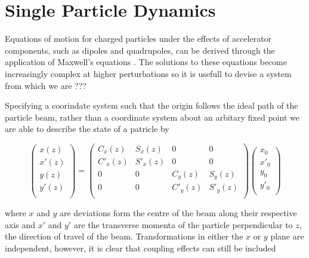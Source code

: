 

\section{Single Particle Dynamics}
\label{sec:single_particle_dynamics}

Equations of motion for charged particles under the effects of accelerator
components, such as dipoles and quadrupoles, can be derived through the
application of Maxwell's equations \cite{}. The solutions to these equations
become increasingly complex at higher perturbations so it is usefull to devise
a system from which we are ???

Specifying a coorindate system such that the origin follows the ideal path of
the particle beam, rather than a coordinate system about an arbitary fixed
point we are able to describe the state of a patricle by

\begin{equation}
	\begin{pmatrix}
		x(z) \\ x'(z) \\
		y(z) \\ y'(z) \\
	\end{pmatrix}
	=
	\begin{pmatrix}
		C_x(z)  & S_x(z)  & 0 & 0 \\
		C'_x(z) & S'_x(z) & 0 & 0 \\
		0 & 0 & C_y(z)  & S_y(z)  \\
		0 & 0 & C'_y(z) & S'_y(z) \\
	\end{pmatrix}
	\begin{pmatrix}
		x_0 \\ x'_0 \\
		y_0 \\ y'_0 \\
	\end{pmatrix}
\end{equation}

where \(x\) and \(y\) are deviations form the centre of the beam along their
respective axis and \(x'\) and \(y'\) are the transverse momenta of the
particle perpendicular to \(z\), the direction of travel of the beam.
Transformations in either the $x$ or $y$ plane are independent, however, it is
clear that coupling effects can still be included




